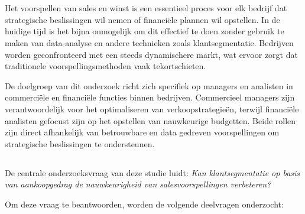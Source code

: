 
\chapter{}%
\label{ch:inleiding}


\section{}%
\label{sec:probleemstelling}

Het voorspellen van sales en winst is een essentieel proces voor elk bedrijf dat strategische beslissingen wil nemen of financiële plannen wil opstellen. In de huidige tijd is het bijna onmogelijk om dit effectief te doen zonder gebruik te maken van data-analyse en andere technieken zoals klantsegmentatie. Bedrijven worden geconfronteerd met een steeds dynamischere markt, wat ervoor zorgt dat traditionele voorspellingsmethoden vaak tekortschieten.
 
\vspace{1em}

De doelgroep van dit onderzoek richt zich specifiek op managers en analisten in commerciële en financiële functies binnen bedrijven. Commercieel managers zijn verantwoordelijk voor het optimaliseren van verkoopstrategieën, terwijl financiële analisten gefocust zijn op het opstellen van nauwkeurige budgetten. Beide rollen zijn direct afhankelijk van betrouwbare en data gedreven voorspellingen om strategische beslissingen te ondersteunen.

\vspace{55mm}

\section{}%
\label{sec:onderzoeksvraag}

De centrale onderzoeksvraag van deze studie luidt: \textit{Kan klantsegmentatie op basis van aankoopgedrag de nauwkeurigheid van salesvoorspellingen verbeteren?}

Om deze vraag te beantwoorden, worden de volgende deelvragen onderzocht:

